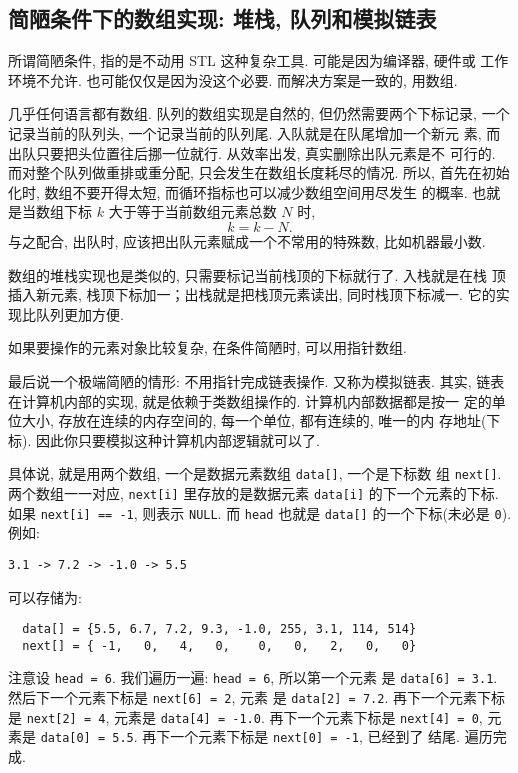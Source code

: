\documentclass[a4paper]{ctexart}
\theoremstyle{definition}
\theoremstyle{definition}
\begin{document}
\subsection{简陋条件下的数组实现: 堆栈, 队列和模拟链表}

所谓简陋条件, 指的是不动用 STL 这种复杂工具. 可能是因为编译器, 硬件或
工作环境不允许. 也可能仅仅是因为没这个必要. 而解决方案是一致的, 用数组.

几乎任何语言都有数组. 队列的数组实现是自然的, 但仍然需要两个下标记录,
一个记录当前的队列头, 一个记录当前的队列尾. 入队就是在队尾增加一个新元
素, 而出队只要把头位置往后挪一位就行. 从效率出发, 真实删除出队元素是不
可行的. 而对整个队列做重排或重分配, 只会发生在数组长度耗尽的情况. 所以,
首先在初始化时, 数组不要开得太短, 而循环指标也可以减少数组空间用尽发生
的概率. 也就是当数组下标 $k$ 大于等于当前数组元素总数 $N$ 时,
$$
k = k - N.
$$
与之配合, 出队时, 应该把出队元素赋成一个不常用的特殊数, 比如机器最小数. 

数组的堆栈实现也是类似的, 只需要标记当前栈顶的下标就行了. 入栈就是在栈
顶插入新元素, 栈顶下标加一；出栈就是把栈顶元素读出, 同时栈顶下标减一.
它的实现比队列更加方便.

如果要操作的元素对象比较复杂, 在条件简陋时, 可以用指针数组.

最后说一个极端简陋的情形: 不用指针完成链表操作. 又称为模拟链表. 其实,
链表在计算机内部的实现, 就是依赖于类数组操作的. 计算机内部数据都是按一
定的单位大小, 存放在连续的内存空间的, 每一个单位, 都有连续的, 唯一的内
存地址(下标). 因此你只要模拟这种计算机内部逻辑就可以了.

具体说, 就是用两个数组, 一个是数据元素数组 \verb|data[]|, 一个是下标数
组 \verb|next[]|. 两个数组一一对应, \verb|next[i]| 里存放的是数据元素
\verb|data[i]| 的下一个元素的下标. 如果 \verb|next[i] == -1|, 则表示
\verb|NULL|. 而 \verb|head| 也就是 \verb|data[]| 的一个下标(未必是
\verb|0|).
例如:
\begin{verbatim}
3.1 -> 7.2 -> -1.0 -> 5.5 
\end{verbatim}
可以存储为:
\begin{verbatim}
  data[] = {5.5, 6.7, 7.2, 9.3, -1.0, 255, 3.1, 114, 514}
  next[] = { -1,   0,   4,   0,    0,   0,   2,   0,   0}
\end{verbatim}
注意设 \verb|head = 6|. 我们遍历一遍: \verb|head = 6|, 所以第一个元素
是 \verb|data[6] = 3.1|. 然后下一个元素下标是 \verb|next[6] = 2|, 元素
是 \verb|data[2] = 7.2|. 再下一个元素下标是 \verb|next[2] = 4|, 元素是
\verb|data[4] = -1.0|. 再下一个元素下标是 \verb|next[4] = 0|, 元素是
\verb|data[0] = 5.5|. 再下一个元素下标是 \verb|next[0] = -1|, 已经到了
结尾. 遍历完成. 
\end{document}
